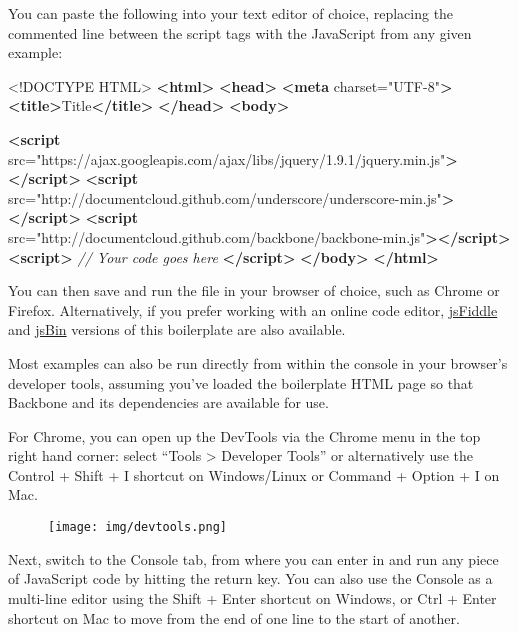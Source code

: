 \documentclass[9pt]{book}
\newenvironment{Shaded}{}{}
\newcommand{\KeywordTok}[1]{\textcolor[rgb]{0.00,0.44,0.13}{\textbf{{#1}}}}
\newcommand{\DataTypeTok}[1]{\textcolor[rgb]{0.56,0.13,0.00}{{#1}}}
\newcommand{\StringTok}[1]{\textcolor[rgb]{0.25,0.44,0.63}{{#1}}}
\newcommand{\CommentTok}[1]{\textcolor[rgb]{0.38,0.63,0.69}{\textit{{#1}}}}
\newcommand{\OtherTok}[1]{\textcolor[rgb]{0.00,0.44,0.13}{{#1}}}
\newcommand{\NormalTok}[1]{{#1}}
\begin{document}
You can paste the following into your text editor of choice, replacing
the commented line between the script tags with the JavaScript from any
given example:

\begin{Shaded}
\begin{Highlighting}[]
\DataTypeTok{<!DOCTYPE }\NormalTok{HTML}\DataTypeTok{>}
\KeywordTok{<html>}
\KeywordTok{<head>}
    \KeywordTok{<meta}\OtherTok{ charset=}\StringTok{"UTF-8"}\KeywordTok{>}
    \KeywordTok{<title>}\NormalTok{Title}\KeywordTok{</title>}
\KeywordTok{</head>}
\KeywordTok{<body>}

\KeywordTok{<script}\OtherTok{ src=}\StringTok{"https://ajax.googleapis.com/ajax/libs/jquery/1.9.1/jquery.min.js"}\KeywordTok{></script>}
\KeywordTok{<script}\OtherTok{ src=}\StringTok{"http://documentcloud.github.com/underscore/underscore-min.js"}\KeywordTok{></script>}
\KeywordTok{<script}\OtherTok{ src=}\StringTok{"http://documentcloud.github.com/backbone/backbone-min.js"}\KeywordTok{></script>}
\KeywordTok{<script>}
  \CommentTok{// Your code goes here}
\KeywordTok{</script>}
\KeywordTok{</body>}
\KeywordTok{</html>}
\end{Highlighting}
\end{Shaded}

You can then save and run the file in your browser of choice, such as
Chrome or Firefox. Alternatively, if you prefer working with an online
code editor, \href{http://jsfiddle.net/jnf8B/}{jsFiddle} and
\href{http://jsbin.com/iwiwox/1/edit}{jsBin} versions of this
boilerplate are also available.

Most examples can also be run directly from within the console in your
browser's developer tools, assuming you've loaded the boilerplate HTML
page so that Backbone and its dependencies are available for use.

For Chrome, you can open up the DevTools via the Chrome menu in the top
right hand corner: select ``Tools \textgreater{} Developer Tools'' or
alternatively use the Control + Shift + I shortcut on Windows/Linux or
Command + Option + I on Mac.

\begin{figure}[htbp]
\centering
\texttt{[image: img/devtools.png]}
\end{figure}

Next, switch to the Console tab, from where you can enter in and run any
piece of JavaScript code by hitting the return key. You can also use the
Console as a multi-line editor using the Shift + Enter shortcut on
Windows, or Ctrl + Enter shortcut on Mac to move from the end of one
line to the start of another.
\end{document}
